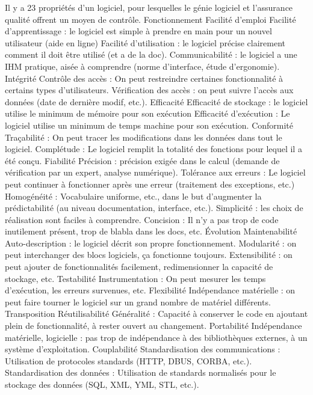 Il y a 23 propriétés d'un logiciel, pour lesquelles le génie logiciel et l'assurance qualité offrent un moyen de contrôle.
Fonctionnement
Facilité d'emploi	
Facilité d'apprentissage : le logiciel est simple à prendre en main pour un nouvel utilisateur (aide en ligne)		
Facilité d'utilisation : le logiciel précise clairement comment il doit être utilisé (et a de la doc).
Communicabilité : le logiciel a une IHM pratique, aisée à comprendre (norme d'interface, étude d'ergonomie).
Intégrité
Contrôle des accès : On peut restreindre certaines 	fonctionnalité à certains types d'utilisateurs.			
Vérification des accès : on peut suivre l'accès aux données (date de dernière modif, etc.).
Efficacité
Efficacité de stockage : le logiciel utilise le minimum de mémoire pour son exécution			
Efficacité d'exécution : Le logiciel utilise un minimum de temps machine pour son exécution.
Conformité
Traçabilité : On peut tracer les modifications dans les données dans tout le logiciel.		
Complétude : Le logiciel remplit la totalité des fonctions pour lequel il a été conçu.
Fiabilité
Précision : précision exigée dans le calcul (demande de vérification par un expert, analyse numérique).
Tolérance aux erreurs : Le logiciel peut continuer à fonctionner après une erreur (traitement des exceptions, etc.)
Homogénéité : Vocabulaire uniforme, etc., dans le but d'augmenter la prédictabilité (au niveau documentation, interface, etc.).
Simplicité : les choix de réalisation sont faciles à comprendre.
Concision : Il n'y a pas trop de code inutilement présent, trop de blabla dans les docs, etc.
Évolution
Maintenabilité		
Auto-description : le logiciel décrit son propre fonctionnement.		
Modularité : on peut interchanger des blocs logiciels, ça fonctionne toujours.
Extensibilité : on peut ajouter de fonctionnalités facilement, redimensionner la capacité de stockage, etc.
Testabilité
Instrumentation : On peut mesurer les temps d'exécution, les erreurs survenues, etc.		
Flexibilité
Indépendance matérielle : on peut faire tourner le logiciel sur un grand nombre de matériel différents.	
Transposition
Réutilisabilité	
Généralité : Capacité à conserver le code en ajoutant plein de fonctionnalité, à rester ouvert au changement.	
Portabilité	
Indépendance matérielle, logicielle : pas trop de indépendance à des bibliothèques externes, à un système d'exploitation.
Couplabilité
Standardisation des communications : Utilisation de 	 protocoles standards (HTTP, DBUS, CORBA, etc.).
Standardisation des données : Utilisation de standards normalisés pour le stockage des données (SQL, XML, YML, STL, etc.).


